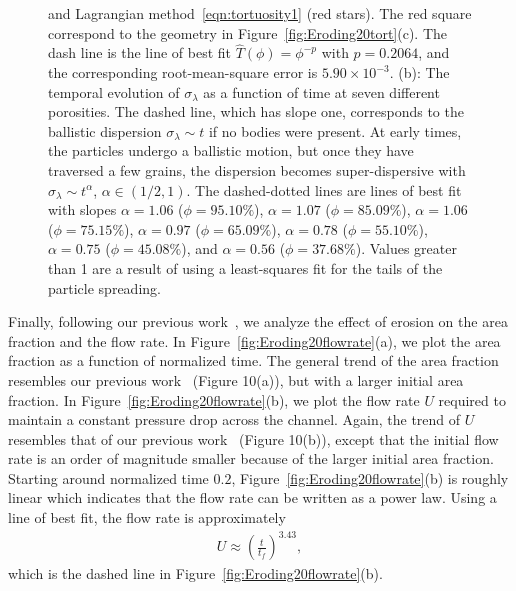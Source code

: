 \documentclass[preprint,10pt]{elsarticle}
\begin{document}
\begin{figure}[H]
{and Lagrangian method~\eqref{eqn:tortuosity1} (red stars).  The red
square correspond to the geometry in Figure~\ref{fig:Eroding20tort}(c).
The dash line is the line of best fit $\widehat{T}(\phi)=\phi^{-p}$ with
$p=0.2064$, and the corresponding root-mean-square error is $5.90 \times
10^{-3}$. (b): The temporal evolution of $\sigma_\lambda$ as a function
of time at seven different porosities.  The dashed line, which has slope
one, corresponds to the ballistic dispersion $\sigma_\lambda \sim t$ if
no bodies were present. At early times, the particles undergo a
ballistic motion, but once they have traversed a few grains, the
dispersion becomes super-dispersive with $\sigma_\lambda \sim t^\alpha$,
$\alpha \in (1/2,1)$.  The dashed-dotted lines are lines of best fit
with slopes $\alpha = 1.06$ ($\phi=95.10\%$), $\alpha = 1.07$
($\phi=85.09\%$), $\alpha = 1.06$ ($\phi=75.15\%$), $\alpha = 0.97$
($\phi=65.09\%$), $\alpha = 0.78$ ($\phi=55.10\%$), $\alpha = 0.75$
($\phi=45.08\%$), and $\alpha = 0.56$ ($\phi=37.68\%$).  Values greater
than 1 are a result of using a least-squares fit for the tails of the
particle spreading.}
\end{figure}

Finally, following our previous work~\cite{qua-moo2018}, we analyze the
effect of erosion on the area fraction and the flow rate.  In
Figure~\ref{fig:Eroding20flowrate}(a), we plot the area fraction as a
function of normalized time.  The general trend of the area fraction
resembles our previous work~\cite{qua-moo2018} (Figure 10(a)), but with
a larger initial area fraction.  In
Figure~\ref{fig:Eroding20flowrate}(b), we plot the flow rate $U$
required to maintain a constant pressure drop across the channel.
Again, the trend of $U$ resembles that of our previous
work~\cite{qua-moo2018} (Figure 10(b)), except that the initial flow
rate is an order of magnitude smaller because of the larger initial area
fraction.  Starting around normalized time $0.2$,
Figure~\ref{fig:Eroding20flowrate}(b) is roughly linear which indicates
that the flow rate can be written as a power law.  Using a line of best
fit, the flow rate is approximately 
\begin{align} 
  U \approx \left(\frac{t}{t_f}\right)^{3.43},
\end{align}
which is the dashed line in Figure~\ref{fig:Eroding20flowrate}(b).
\end{document}
